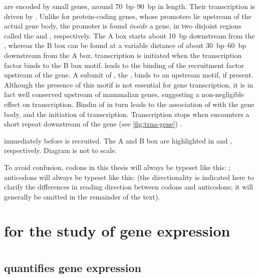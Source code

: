 \trna[s] are encoded by small genes, around \SIrange{70}{90}{bp} in length.
Their transcription is driven by . Unlike for protein-coding genes, whose
promoters lie upstream of the actual gene body, the promoter is found
\emph{inside} a \trna gene, in two disjoint regions called the 
and , respectively. The A box starts about \SI{10}{bp} downstream
from the \tss, whereas the B box can be found at a variable distance of about
\SIrange{30}{60}{bp} downstream from the A box. \trna transcription is initiated
when the transcription factor \tfiiic binds to the B box motif. \tfiiic leads to
the binding of the  recruitment factor \tfiiib upstream of the \trna gene.
A subunit of \tfiiib, the \tbp, binds to an upstream  motif, if
present. Although the presence of this motif is not essential for \trna gene
transcription, it is in fact well conserved upstream of mammalian \trna genes,
suggesting a non-negligible effect on transcription. Bindin of \tfiiib in turn
leads to the association of  with the gene body, and the initiation of
transcription. Transcription stops when  encounters a short \nT repeat
downstream of the \trna gene (see \cref{fig:trna-gene}) \citep{Dieci:2007}.

    {immediately before  is recruited. The A and B box are highlighted in
    \primaryname{} and \secondaryname{}, respectively. Diagram is not to scale.}

To avoid confusion, codons in this thesis will always be typeset like this:
; anticodons will always be typeset like this:
 (the directionality is indicated here to clarify the
differences in reading direction between codons and anticodons; it will
generally be omitted in the remainder of the text).

\section{ for the study of gene expression}

\section{}

\subsection{ quantifies  gene expression}

